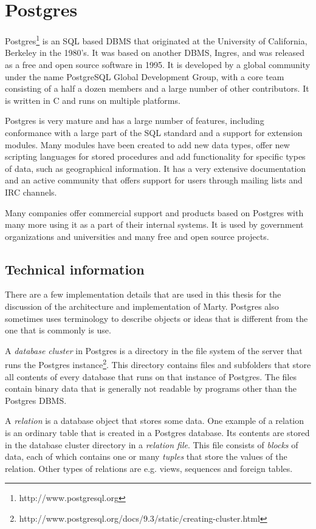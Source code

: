 \section{Postgres}
Postgres\footnote{http://www.postgresql.org} is an SQL based DBMS that originated at the University of California, Berkeley in the 1980's.
It was based on another DBMS, Ingres, and was released as a free and open source software in 1995.
It is developed by a global community under the name PostgreSQL Global Development Group, with a core team consisting of a half a dozen members and a large number of other contributors.
It is written in C and runs on multiple platforms.

Postgres is very mature and has a large number of features, including conformance with a large part of the SQL standard and a support for extension modules.
Many modules have been created to add new data types, offer new scripting languages for stored procedures and add functionality for specific types of data, such as geographical information.
It has a very extensive documentation and an active community that offers support for users through mailing lists and IRC channels.

Many companies offer commercial support and products based on Postgres with many more using it as a part of their internal systems.
It is used by government organizations and universities and many free and open source projects.

\subsection{Technical information}
There are a few implementation details that are used in this thesis for the discussion of the architecture and implementation of Marty.
Postgres also sometimes uses terminology to describe objects or ideas that is different from the one that is commonly is use.

A \textit{database cluster} in Postgres is a directory in the file system of the server that runs the Postgres instance\footnote{http://www.postgresql.org/docs/9.3/static/creating-cluster.html}.
This directory contains files and subfolders that store all contents of every database that runs on that instance of Postgres.
The files contain binary data that is generally not readable by programs other than the Postgres DBMS.

A \textit{relation} is a database object that stores some data.
One example of a relation is an ordinary table that is created in a Postgres database.
Its contents are stored in the database cluster directory in a \textit{relation file}.
This file consists of \textit{blocks} of data, each of which contains one or many \textit{tuples} that store the values of the relation.
Other types of relations are e.g. views, sequences and foreign tables.

